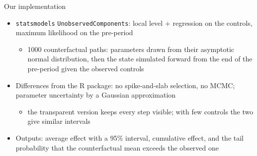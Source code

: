 \begin{frame}{Our implementation}
\itemsize{\small}
\begin{itemize}
    \item \texttt{statsmodels} \texttt{UnobservedComponents}: local level + regression on the controls, maximum likelihood on the pre-period
    \begin{itemize}
        \item 1000 counterfactual paths: parameters drawn from their asymptotic normal distribution, then the state simulated forward from the end of the pre-period given the observed controls
    \end{itemize}
    \item Differences from the R package: no spike-and-slab selection, no MCMC; parameter uncertainty by a Gaussian approximation
    \begin{itemize}
        \item the transparent version keeps every step visible; with few controls the two give similar intervals
    \end{itemize}
    \item Outputs: average effect with a 95\% interval, cumulative effect, and the tail probability that the counterfactual mean exceeds the observed one
\end{itemize}
\end{frame}

